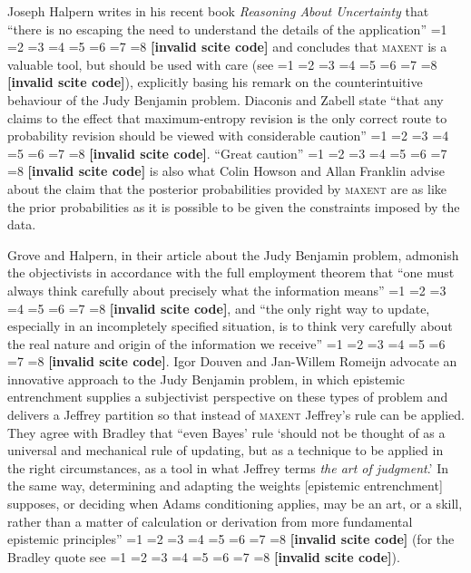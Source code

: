 \documentclass[12pt]{article}
\newcommand{\qeins}[1]{``#1''}
\newcommand{\qzwei}[1]{`#1'}
\newif\ifNumericalOrYear
\newcommand{\PageP}{p.~}
\newcommand{\PageP}{}
\newcommand{\scite}[3]{\ifnum#1=1\ifNumericalOrYear\citep{#2}\else\citeyearpar{#2}\fi\else
\ifnum#1=2\ifNumericalOrYear\citep[#3]{#2}\else\citep[{\PageP}#3]{#2}\fi\else
\ifnum#1=3\ifNumericalOrYear(\citet[#3]{#2})\else\citep[{\PageP}#3]{#2}\fi\else
\ifnum#1=4\ifNumericalOrYear\citet{#2}\else\citet{#2}\fi\else
\ifnum#1=5\ifNumericalOrYear(\citet{#2})\else\citep{#2}\fi\else
\ifnum#1=6\ifNumericalOrYear(\citet[#3]{#2})\else\citep[{\PageP}#3]{#2}\fi\else
\ifnum#1=7\ifNumericalOrYear\citep{#2}\else\citealp{#2}\fi\else
\ifnum#1=8\ifNumericalOrYear\citep[#3]{#2}\else\citealp[{\PageP}#3]{#2}\fi\else
\textbf{[invalid scite code]}\fi\fi\fi\fi\fi\fi\fi\fi}
\begin{document}
Joseph Halpern writes in his recent book \emph{Reasoning About
  Uncertainty} that \qeins{there is no escaping the need to understand
  the details of the application} \scite{2}{halpern03}{423} and
concludes that \textsc{maxent} is a valuable tool, but should be used
with care (see \scite{8}{grovehalpern97}{110}), explicitly basing his
remark on the counterintuitive behaviour of the Judy Benjamin problem.
Diaconis and Zabell state \qeins{that any claims to the effect that
  maximum-entropy revision is the only correct route to probability
  revision should be viewed with considerable caution}
\scite{2}{diaconiszabell82}{829}. \qeins{Great caution}
\scite{2}{howsonfranklin94}{456} is also what Colin Howson and Allan
Franklin advise about the claim that the posterior probabilities
provided by \textsc{maxent} are as like the prior probabilities as it
is possible to be given the constraints imposed by the data.

Grove and Halpern, in their article about the Judy Benjamin problem,
admonish the objectivists in accordance with the full employment
theorem that \qeins{one must always think carefully about precisely
  what the information means} \scite{2}{grovehalpern97}{6}, and
\qeins{the only right way to update, especially in an incompletely
  specified situation, is to think very carefully about the real
  nature and origin of the information we receive}
\scite{2}{grovehalpern97}{3}. Igor Douven and Jan-Willem Romeijn
advocate an innovative approach to the Judy Benjamin problem, in which
epistemic entrenchment supplies a subjectivist perspective on these
types of problem and delivers a Jeffrey partition so that instead of
\textsc{maxent} Jeffrey's rule can be applied. They agree with Bradley
that \qeins{even Bayes' rule \qzwei{should not be thought of as a
    universal and mechanical rule of updating, but as a technique to
    be applied in the right circumstances, as a tool in what Jeffrey
    terms \emph{the art of judgment}.} In the same way, determining
  and adapting the weights [epistemic entrenchment] supposes, or
  deciding when Adams conditioning applies, may be an art, or a skill,
  rather than a matter of calculation or derivation from more
  fundamental epistemic principles} \scite{2}{douvenromeijn09}{16}
(for the Bradley quote see \scite{8}{bradley05}{362}).
\end{document}

